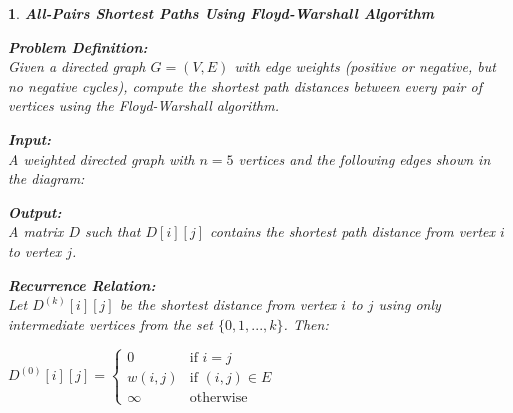 \documentclass[%
addpoints]{exam}
\theoremstyle{problem}
\newtheorem{p}{}
\begin{document}
\begin{p}
\textbf{All-Pairs Shortest Paths Using Floyd-Warshall Algorithm}

\textbf{Problem Definition:}\\
Given a directed graph $G = (V, E)$ with edge weights (positive or negative, but no negative cycles), compute the shortest path distances between every pair of vertices using the Floyd-Warshall algorithm.

\textbf{Input:}\\
A weighted directed graph with $n = 5$ vertices and the following edges shown in the diagram:

\begin{center}
\end{center}

\textbf{Output:}\\
A matrix $D$ such that $D[i][j]$ contains the shortest path distance from vertex $i$ to vertex $j$.

\textbf{Recurrence Relation:}\\
Let $D^{(k)}[i][j]$ be the shortest distance from vertex $i$ to $j$ using only intermediate vertices from the set $\{0, 1, ..., k\}$. Then:

$D^{(0)}[i][j] = 
\begin{cases} 
0 & \text{if } i = j \\
w(i, j) & \text{if } (i, j) \in E \\
\infty & \text{otherwise}
\end{cases}$


\end{p}
\end{document}
